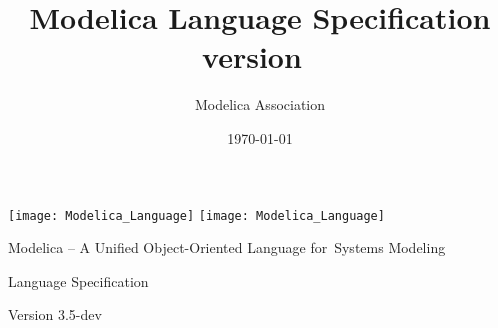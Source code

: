 \documentclass[10pt,a4paper]{report}
\title{Modelica\textsuperscript{\textregistered} Language Specification version~\mlsversion}
\date{\today}
\author{Modelica Association}
\newcommand{\mlsversion}{3.5-dev}
\begin{document}
\hypersetup{pageanchor=false,bookmarksdepth=2,destlabel=true,bookmarksopenlevel=0}

\begin{titlepage}
\addtolength{\parskip}{\baselineskip}%
\vspace*{\fill}
\begin{center}
\ifpdf
\texttt{[image: Modelica\_Language]}
\else
\texttt{[image: Modelica\_Language]}
\fi
\vspace{1cm}

\huge
Modelica\textsuperscript{\textregistered} -- A Unified Object-Oriented Language for~Systems Modeling

Language Specification

Version \mlsversion

\vspace{1cm}%

\Large
\makeatletter
\@date

\@author
\makeatother
\end{center}

\ifpdf
\vfill
\else
\newpage %
\fi

\end{titlepage}

%
\cleardoublepage
\pagestyle{fancy}
\renewcommand{\headrulewidth}{0.0pt}
\end{document}
